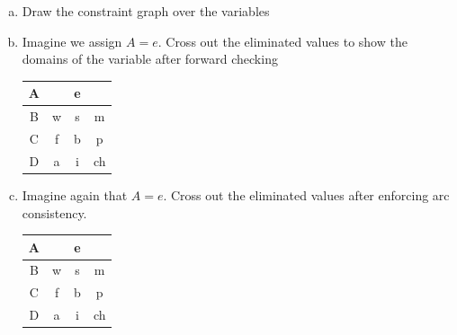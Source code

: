 \documentclass[a4paper]{article}
\begin{document}
\begin{enumerate}[(a)]
\item Draw the constraint graph over the variables

\newpage




\item Imagine we assign $A=e$. Cross out the eliminated values to show the domains of the variable after forward checking
\begin{center}
\begin{tabular}{|c|c|c|c|}
\hline
A &  & e &  \\
\hline
B& w & s  & m  \\
\hline
C& f & b  & p  \\
\hline
D& a & i  & ch  \\
\hline
\end{tabular}
\end{center}


\item Imagine again that $A=e$. Cross out the eliminated values after enforcing arc consistency.
\begin{center}
\begin{tabular}{|c|c|c|c|}
\hline
A &  & e &  \\
\hline
B& w & s  & m  \\
\hline
C& f & b  & p  \\
\hline
D& a & i  & ch  \\
\hline
\end{tabular}
\end{center}



\end{enumerate}
\end{document}
